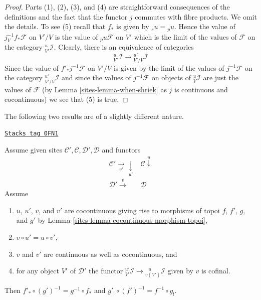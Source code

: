 \begin{proof}

Parts (1), (2), (3), and (4) are straightforward consequences of the
definitions and the fact that the functor $j$ commutes with fibre products.
We omit the details. To see (5) recall that $f_*$ is given by
${}_su = {}_pu$. Hence the value of $j_V^{-1}f_*\mathcal{F}$ on
$V'/V$ is the value of ${}_pu\mathcal{F}$ on $V'$ which is the
limit of the values of $\mathcal{F}$ on the category
${}^u_{V'}\mathcal{I}$. Clearly, there is an equivalence
of categories
$$
{}^u_{V'}\mathcal{I} \to {}^{u'}_{V'/V}\mathcal{I}
$$
Since the value of $f'_*j^{-1}\mathcal{F}$ on $V'/V$ is
given by the limit of the values of $j^{-1}\mathcal{F}$
on the category ${}^{u'}_{V'/V}\mathcal{I}$ and since
the values of $j^{-1}\mathcal{F}$ on objects of
${}^u_V\mathcal{I}$ are just the values of $\mathcal{F}$
(by Lemma \ref{sites-lemma-when-shriek} as $j$ is continuous and
cocontinuous)
we see that (5) is true.
\end{proof}

The following two results are of a slightly different nature.

\begin{lemma}
\label{sites-lemma-special-square-cocontinuous}
\href{https://stacks.math.columbia.edu/tag/0FN1}{\texttt{Stacks tag 0FN1}}

Assume given sites $\mathcal{C}', \mathcal{C}, \mathcal{D}', \mathcal{D}$
and functors
$$
\begin{array}{cc}\mathcal{C}' \underset{v'}{\longrightarrow}\underset{u'}{\downarrow} & \mathcal{C} \overset{u}{\downarrow} \\ \mathcal{D}' \overset{v}{\longrightarrow} & \mathcal{D}\end{array}
$$
Assume
\begin{enumerate}
\item $u$, $u'$, $v$, and $v'$ are cocontinuous giving rise to morphisms of
topoi $f$, $f'$, $g$, and $g'$ by Lemma \ref{sites-lemma-cocontinuous-morphism-topoi},
\item $v \circ u' = u \circ v'$,
\item $v$ and $v'$ are continuous as well as cocontinuous, and
\item for any object $V'$ of $\mathcal{D}'$ the functor
${}^{u'}_{V'}\mathcal{I} \to {}^{\ \ \ u}_{v(V')}\mathcal{I}$
given by $v$ is cofinal.
\end{enumerate}
Then $f'_* \circ (g')^{-1} = g^{-1} \circ f_*$ and
$g'_! \circ (f')^{-1} = f^{-1} \circ g_!$.
\end{lemma}

